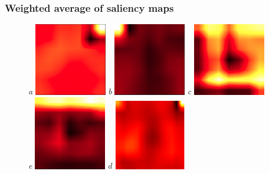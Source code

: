 \documentclass[8pt]{beamer}
\begin{document}
  \begin{frame}
\frametitle{Weighted average of saliency maps}
\begin{figure}[H]
  \centering \emph{a}
  \includegraphics[width=0.28\textwidth]{images/heatmap_224_noda}\hspace{0.01\textwidth}%
  \emph{b}
  \includegraphics[width=0.28\textwidth]{images/heatmap_224_da}\hspace{0.01\textwidth}%
  \emph{c} \includegraphics[width=0.28\textwidth]{images/heatmap_224_cropped}\\[0.01\textwidth]
  \hspace{0.15\textwidth} \emph{e}
  \includegraphics[width=0.28\textwidth]{images/heatmap_224_no_in}\hspace{0.01\textwidth}%
  \emph{d} \includegraphics[width=0.28\textwidth]{images/heatmap_224_guangzhou}\hspace{0.15\textwidth}\\[0.01\textwidth]

\end{figure}
\end{frame}
\end{document}
